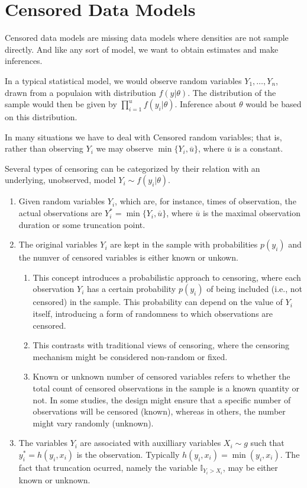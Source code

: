 \section{Censored Data Models}

Censored data models are missing data models where densities are not sample directly.
And like any sort of model, we want to obtain estimates and make inferences.

In a typical statistical model, we would observe random variables $Y_1, \ldots, Y_n$, drawn from a
populaion with distribution $f(y|\theta)$.
The distribution of the sample would then be given by $\prod^{u}_{i=1} f(y_i | \theta)$.
Inference about $\theta$ would be based on this distribution.

In many situations we have to deal with Censored random variables; that is, rather than observing $Y_i$
we may observe $\min\{ Y_i, \overline{u} \}$, where $\overline{u}$ is a constant.

Several types of censoring can be categorized by their relation with an underlying, unobserved, model
$Y_i \sim f(y_i|\theta)$.

\begin{enumerate}
\item Given random variables $Y_i$, which are, for instance, times of observation, the actual observations
    are $Y^{*}_i = \min\{Y_i, \overline{u}\}$, where $\overline{u}$ is the maximal observation duration or some truncation point.

\item The original variables $Y_i$ are kept in the sample with probabilities $p(y_i)$ and the numver of censored variables is either
    known or unkown.
    \begin{enumerate}
    \item This concept introduces a probabilistic approach to censoring, where each observation $Y_i$ has a certain probability
        $p(y_i)$ of being included (i.e., not censored) in the sample. This probability can depend on the value of $Y_i$ itself,
        introducing a form of randomness to which observations are censored.
    \item This contrasts with traditional views of censoring, where the censoring mechanism might be considered non-random or fixed.
    \item Known or unknown number of censored variables refers to whether the total count of censored observations in the sample
        is a known quantity or not. In some studies, the design might ensure that a specific number of observations will be censored
        (known), whereas in others, the number might vary randomly (unknown).
    \end{enumerate}

\item The variables $Y_i$ are associated with auxilliary variables $X_i \sim g$ such that $y^{*}_{i} = h(y_i, x_i)$ is the observation.
Typically $h(y_i,x_i) = \min(y_i, x_i)$. The fact that truncation ocurred, namely the variable $\mathbb{I}_{Y_i > X_i}$,
may be either known or unknown.
\end{enumerate}

